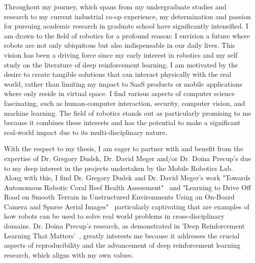 \documentclass{article}
\begin{document}
Throughout my journey, which spans from my undergraduate studies and research to my current 
industrial co-op experience, my determination and passion for pursuing academic research in graduate school 
have significantly intensified. I am drawn to the field of robotics for a profound reason: I envision a future 
where robots are not only ubiquitous but also indispensable in our daily lives. This vision has been a 
driving force since my early interest in robotics and my self study on the literature of deep reinforcement 
learning. I am motivated by the desire to create tangible 
solutions that can interact physically with the real world, rather than 
limiting my impact to SaaS products or mobile applications where only reside in virtual space.
I find various aspects of computer science fascinating, such as human-computer interaction, security, 
computer vision, and machine learning. The field of robotics stands out as particularly promising to me 
because it combines these interests and has the potential to make a significant real-world impact due to 
its multi-disciplinary nature.


With the respect to my thesis, I am eager to partner with and benefit from the expertise of 
Dr. Gregory Dudek, Dr. David Meger and/or Dr. Doina Precup's due to my deep interest in the projects undertaken by 
the Mobile Robotics Lab. Along with this, I find Dr. Gregory Dudek
and Dr. David Meger's work "Towards Autonomous Robotic Coral Reef Health Assessment"~\cite{manderson2016towards}
and "Learning to Drive Off Road on Smooth Terrain in Unstructured Environments Using an On-Board Camera and Sparse Aerial Images"~\cite{manderson2020learning}
particularly captivating that are examples of how robots can be used to solve real world problems in cross-disciplinary domains.
Dr. Doina Precup's research, as demonstrated in 'Deep Reinforcement Learning That Matters'~\cite{henderson2018deep}, greatly interests me 
because it addresses the crucial aspects of reproducibility and the advancement of deep reinforcement learning research, 
which aligns with my own values.


\end{document}
